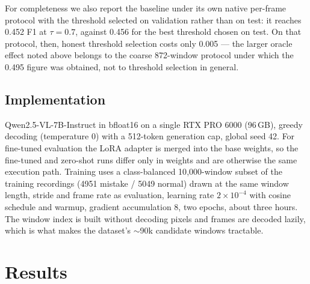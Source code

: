 \documentclass[10pt,twocolumn]{article}
\begin{document}
For completeness we also report the baseline under its own native per-frame
protocol with the threshold selected on validation rather than on test: it
reaches 0.452 F1 at $\tau=0.7$, against 0.456 for the best threshold chosen on
test. On that protocol, then, honest threshold selection costs only 0.005 --- the
larger oracle effect noted above belongs to the coarse 872-window protocol under
which the 0.495 figure was obtained, not to threshold selection in general.

\subsection{Implementation}
Qwen2.5-VL-7B-Instruct in bfloat16 on a single RTX PRO 6000 (96\,GB), greedy
decoding (temperature 0) with a 512-token generation cap, global seed 42. For
fine-tuned evaluation the LoRA adapter is merged into the base weights, so the
fine-tuned and zero-shot runs differ only in weights and are otherwise the same
execution path. Training uses a class-balanced 10{,}000-window subset of the
training recordings (4951 mistake / 5049 normal) drawn at the same window length,
stride and frame rate as evaluation, learning rate $2\!\times\!10^{-4}$ with
cosine schedule and warmup, gradient accumulation 8, two epochs, about three
hours. The window index is built without decoding pixels and frames are decoded
lazily, which is what makes the dataset's $\sim$90k candidate windows tractable.

\section{Results}
\label{sec:results}

\begin{table}[t]
\centering\footnotesize
\setlength{\tabcolsep}{3.5pt}
\caption{Online causal detection on the \textbf{complete} CaptainCook4D test
split: all \resClips{} recordings, \resWindows{} windows, no subsetting. Each arm
uses its own decision layer selected on validation and applied to test once.
Brackets are 95\% clip-level bootstrap intervals (1000 resamples, seed 0).
macro F1$^{-}$ excludes the structurally unreachable \texttt{missing\_step}
class. AUC is computed on raw ungated scores and is therefore threshold-free.
ECE is reported for every row because the decision-token score is informative but
uncalibrated (Section~\ref{sec:confidence}); lower is better, and the baseline is
the best-calibrated row. Binary F1 and the localisation columns use different
firing rules by design (Section~\ref{sec:decision}).}
\label{tab:main}
\end{table}
\end{document}
